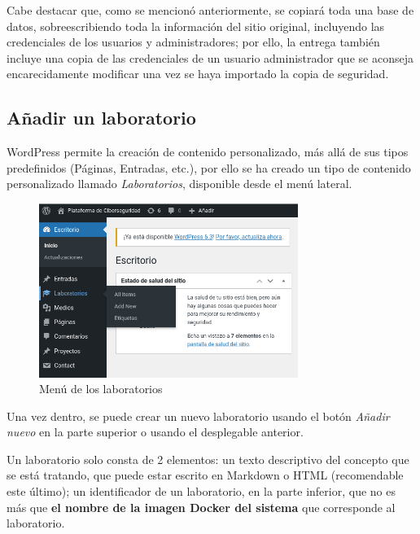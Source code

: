                     Cabe destacar que, como se mencionó anteriormente, se copiará toda una base de datos, sobreescribiendo toda la información del sitio original, incluyendo las credenciales de los usuarios y administradores; por ello, la entrega también incluye una copia de las credenciales de un usuario administrador que se aconseja encarecidamente modificar una vez se haya importado la copia de seguridad.

        \subsection{Añadir un laboratorio}

            WordPress permite la creación de contenido personalizado, más allá de sus tipos predefinidos (Páginas, Entradas, etc.), por ello se ha creado un tipo de contenido personalizado llamado \textit{Laboratorios}, disponible desde el menú lateral.

            \begin{figure}[!htbp]
                \centering

                \includegraphics[width=0.75\textwidth]{images/Capturas/localhost/laboratorios.png}
                \caption{Menú de los laboratorios}
                \label{fig:laboratorios}
            \end{figure}

            Una vez dentro, se puede crear un nuevo laboratorio usando el botón \textit{Añadir nuevo} en la parte superior o usando el desplegable anterior.

            Un laboratorio solo consta de 2 elementos: un texto descriptivo del concepto que se está tratando, que puede estar escrito en Markdown o HTML (recomendable este último); un identificador de un laboratorio, en la parte inferior, que no es más que \textbf{el nombre de la imagen Docker del sistema} que corresponde al laboratorio.

